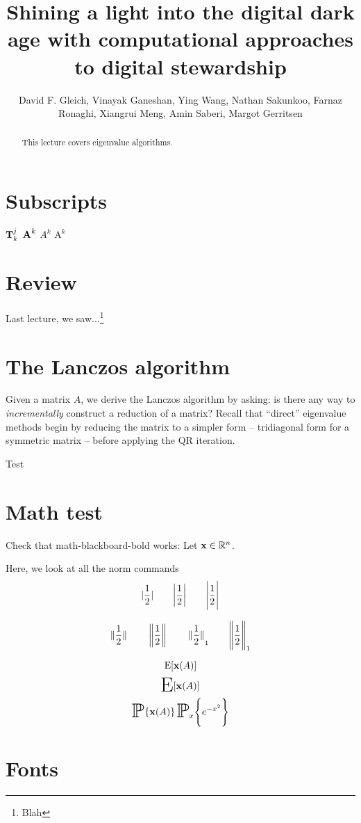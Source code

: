 \documentclass[longtitle,sidenotes,nofonts]{dgleich-article}
\title{Shining a light into the digital dark age with computational approaches to digital stewardship}
\author{David F. Gleich, Vinayak Ganeshan, Ying Wang, Nathan Sakunkoo, Farnaz Ronaghi, Xiangrui Meng, Amin Saberi, Margot Gerritsen}
\begin{document}

 \maketitle

\begin{abstract}
 This lecture covers eigenvalue algorithms.
\end{abstract}

\section{Subscripts}
$\boldsymbol{\mathrm{T}}_{k}^j$
$\boldsymbol{\mathrm{A}}^k$
$A^k$
$\bm{\mathrm{A}}^{k}$

\section{Review}
Last lecture, we saw...\footnote{Blah}

\section{The Lanczos algorithm}
Given a matrix $A$, we derive the Lanczos algorithm by asking:
is there any way to \emph{incrementally} construct a reduction
of a matrix?
Recall that ``direct'' eigenvalue methods begin by reducing
the matrix to a simpler form -- tridiagonal form for a
symmetric matrix -- before applying the QR iteration.

\begin{theorem}%
 Test
\end{theorem}

\section{Math test}
Check that math-blackboard-bold works:
Let $\boldsymbol{\mathrm{x}} \in \mathbb{R}^n$.

Here, we look at all the norm commands
\[
 \absof{\frac{1}{2}} \qquad \absof*{\frac{1}{2}} \qquad \absof[\Bigg]{\frac{1}{2}}
\]

\[
 \normof{\frac{1}{2}} \qquad \normof*{\frac{1}{2}}
 \qquad \normof[1]{\frac{1}{2}} 
 \qquad \normof[1][\Bigg]{\frac{1}{2}} 
\]

\[ \operatorname{E}[\boldsymbol{\mathrm{x}}(A)] \]
\[ \hugeEof{\vx(A)} \]
\[ \hugeprob{\vx(A)} \hugeprob[x][\Bigg]{e^{-x^2}} \]

\section{Fonts}
\end{document}
